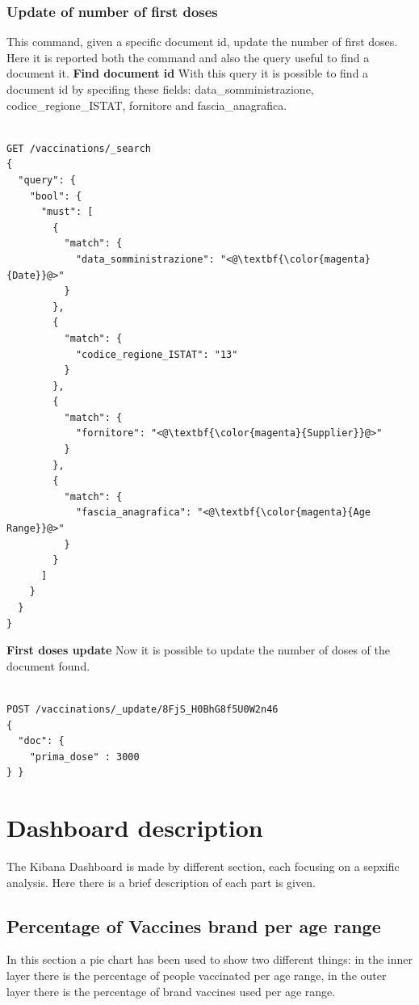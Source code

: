 \documentclass{article}
\begin{document}
\subsubsection{Update of number of first doses}
This command, given a specific document id, update the number of first doses. Here it is reported both the command and also the query useful to find a document it.
\hfill\break
\hfill\break
\textbf{Find document id}
\hfill\break
With this query it is possible to find a document id by specifing these fields: data\_somministrazione, codice\_regione\_ISTAT, fornitore and fascia\_anagrafica.

\begin{lstlisting}[language=cypher, label=lst:cypher-example]

GET /vaccinations/_search
{
  "query": {
    "bool": {
      "must": [
        {
          "match": {
            "data_somministrazione": "<@\textbf{\color{magenta}{Date}}@>"
          }
        },
        {
          "match": {
            "codice_regione_ISTAT": "13"
          }
        },
        {
          "match": {
            "fornitore": "<@\textbf{\color{magenta}{Supplier}}@>"
          }
        },
        {
          "match": {
            "fascia_anagrafica": "<@\textbf{\color{magenta}{Age Range}}@>"
          }
        }
      ]
    }
  }
}
\end{lstlisting}
\hfill\break
\textbf{First doses update}
\hfill\break
Now it is possible to update the number of doses of the document found.

\begin{lstlisting}[language=cypher, label=lst:cypher-example]

POST /vaccinations/_update/8FjS_H0BhG8f5U0W2n46
{
  "doc": {
    "prima_dose" : 3000
} }

\end{lstlisting}
\newpage

\section{Dashboard description}
The Kibana Dashboard is made by different section, each focusing on a sepxific analysis.
Here there is a brief description of each part is given.

\subsection{Percentage of Vaccines brand per age range}
In this section a pie chart has been used to show two different things: in the inner layer there is the percentage of people vaccinated per age range, in the outer layer there is the percentage of brand vaccines used per age range.
\end{document}
